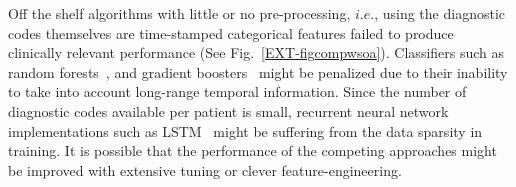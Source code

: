 \documentclass[3p,super,numbers,sort&compress,preprint,10pt]{elsarticle}
\renewcommand{\captionN}[1]{\caption{\color{CadetBlue4!80!black} \sffamily \fontsize{9}{10}\selectfont #1  }}
\begin{document}
Off the shelf algorithms with little or no pre-processing, $i.e.$, using the diagnostic codes themselves are time-stamped categorical features failed to produce clinically relevant performance (See Fig.~\ref{EXT-figcompwsoa}). Classifiers such as random forests~\cite{Breiman}, and gradient boosters~\cite{Friedman} might be penalized due to their inability to take into account long-range temporal information. Since the number of diagnostic codes available per patient is small, recurrent neural network implementations such as LSTM~\cite{Hochreiter} might be suffering from the data sparsity in training. It is possible that the performance of the competing approaches might be improved with extensive tuning or clever feature-engineering.
  
 
%  
\end{document}
